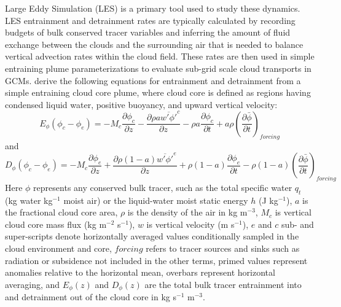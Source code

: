\documentclass[draft,grl]{agutex}
\begin{document}
\begin{article}
Large Eddy Simulation (LES) is a primary tool used to study these dynamics.  
LES entrainment and detrainment rates are typically calculated by recording 
budgets of bulk conserved tracer variables and inferring the amount of fluid 
exchange between the clouds and the surrounding air that is needed to balance 
vertical advection rates within the cloud field.  These rates are then used in 
simple entraining plume parameterizations to evaluate sub-grid scale cloud 
transports in GCMs.  \cite{Siebesma1995} derive the following equations for 
entrainment and detrainment from a simple entraining cloud core plume, where 
cloud core is defined as regions having condensed liquid water, positive 
buoyancy, and upward vertical velocity:
\begin{equation}
  \label{eq:siebesma_entrainment}
    E_{\phi}(\phi_c - \phi_e) = - M_c \frac{\partial \phi_c}{\partial z}
        - \frac{\partial \rho a \overline{w' \phi'}^c}{\partial z}
        - \rho a \frac{\partial \phi_c}{\partial t}
        + a \rho \left(\frac{\partial \bar{\phi}}{\partial t}\right)_{forcing}
\end{equation}
and
\begin{equation}
  \label{eq:siebesma_detrainment}
    D_{\phi}(\phi_c - \phi_e) = - M_c \frac{\partial \phi_e}{\partial z}
        + \frac{\partial \rho (1 - a) \overline{w' \phi'}^e}{\partial z}
        + \rho (1-a) \frac{\partial \phi_e}{\partial t}
     - \rho (1-a) \left(\frac{\partial \bar{\phi}}{\partial t}\right)_{forcing}
\end{equation}
Here $\phi$ represents any conserved bulk tracer, such as the total specific 
water $q_t$ (kg water kg$^{-1}$ moist air) or the liquid-water moist static 
energy $h$ (J kg$^{-1}$), $a$ is the fractional cloud core area, $\rho$ is the 
density of the air in kg m$^{-3}$, $M_c$ is vertical cloud core mass flux 
(kg m$^{-2}$ s$^{-1}$), $w$ is vertical velocity (m s$^{-1}$), $e$ and $c$ sub- 
and super-scripts denote horizontally averaged values conditionally sampled in 
the cloud environment and core, $forcing$ refers to tracer sources and sinks
such as radiation or subsidence not included in the other terms, primed values 
represent anomalies relative to the horizontal mean, overbars represent 
horizontal averaging, and $E_{\phi}(z)$ and $D_{\phi}(z)$ are the total bulk 
tracer entrainment into and detrainment out of the cloud core in 
kg s$^{-1}$ m$^{-3}$.  


\end{article}
\end{document}
